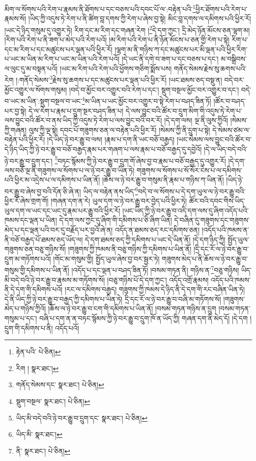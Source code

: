 མིག་ལ་སོགས་པའི་རེག་པ་རྣམས་ནི་ཐོགས་པ་དང་བཅས་པའི་དབང་པོ་ལ་:བརྟེན་པའི་\footnote{རྟེན་པའི་  པེ་ཅིན། }ཕྱིར་ཐོགས་པའི་རེག་པ་རྣམས་སོ། །ཡིད་ཀྱི་འདུས་ཏེ་རེག་པ་ནི་ཚིག་བླ་དགས་ཀྱི་རེག་པ་ཞེས་བྱ་སྟེ། མིང་བླ་དགས་ལ་དམིགས་པའི་ཕྱིར་རོ། །ཡང་དེ་ཉིད་གསུམ་དུ་འགྱུར་ཏེ། རིག་དང་མ་རིག་དང་གཞན་རེག །\footnote{རིག །  སྣར་ཐང་། }དེ་དག་ཀྱང་། དྲི་མེད་ཉོན་མོངས་ཅན་ལྷག་མ། །རིག་པའི་རེག་པ་ནི་ཟག་པ་མེད་པའི་རེག་པའོ། །མ་རིག་པའི་རེག་པ་ནི་ཉོན་མོངས་པ་ཅན་གྱི་རེག་པ་སྟེ། རིག་པ་དང་མ་རིག་པ་དང་མཚུངས་པར་ལྡན་པའི་ཕྱིར་རོ། །ལྷག་མ་ནི་གཉིས་ཀ་དང་མཚུངས་པར་མི་ལྡན་པའི་ཕྱིར་རིག་པ་ཡང་མ་ཡིན་མ་རིག་པ་ཡང་མ་ཡིན་པའི་རེག་པའོ། །དེ་ཡང་ནི་དགེ་བ་ཟག་པ་དང་བཅས་པ་དང་། མ་བསྒྲིབས་ལ་ལུང་དུ་མ་བསྟན་པའོ། །ཡང་མ་རིག་པའི་རེག་པའི་ཕྱོགས་གཅིག་སྨོས་པས། གནོད་སེམས་རྗེས་སུ་ཆགས་པའི་རེག །:གནོད་སེམས་\footnote{གནོད་སེམས་དང་  སྣར་ཐང་།  པེ་ཅིན། }རྗེས་སུ་ཆགས་པ་དང་མཚུངས་པར་ལྡན་པའི་ཕྱིར་རོ། །ཡང་ཐམས་ཅད་བསྡུ་ན། བདེ་བར་མྱོང་འགྱུར་ལ་སོགས་གསུམ། །བདེ་བ་མྱོང་བར་འགྱུར་བའི་རེག་པ་དང་། སྡུག་བསྔལ་མྱོང་བར་འགྱུར་བ་དང་། བདེ་བ་ཡང་མ་ཡིན་:སྡུག་བསྔལ་བ་ཡང་\footnote{སྡུག་བསྔལ་  སྣར་ཐང་།  པེ་ཅིན། }མ་ཡིན་པ་ཡང་མྱོང་བར་འགྱུར་བ་སྟེ་རེག་པ་བཤད་ཟིན་ཏོ། །ཚོར་བ་བཤད་པར་བྱ་སྟེ། དེ་ལ་རེག་པ་རྣམ་པ་དྲུག་སྔར་བཤད་ཟིན་པ། དེ་ལས་བྱུང་བའི་ཚོར་བ་དྲུག་མིག་གི་འདུས་ཏེ་རེག་པ་ལས་བྱུང་བའི་ཚོར་བ་ནས་ཡིད་ཀྱི་འདུས་ཏེ་རེག་པ་ལས་བྱུང་བའི་བར་རོ། །དེ་དག་ལས། ལྔ་ནི་ལུས་ཀྱིའོ། །སེམས་ཀྱི་གཞན། ལུས་ཀྱི་ལྔ་སྟེ། དབང་པོ་གཟུགས་ཅན་ལ་བརྟེན་པའི་ཕྱིར་རོ། །སེམས་ཀྱི་ནི་དྲུག་པ་སྟེ། དེ་སེམས་ཙམ་ལ་བརྟེན་པའི་ཕྱིར་རོ། །དེ་ཡིད་ཉེ་བར་རྒྱུ་བ་ལས། །རྣམ་པ་དག་ནི་ཡང་བཅོ་བརྒྱད། །ཡང་སེམས་ལས་བྱུང་བའི་ཚོར་བ་དེ་ཉིད་ཡིད་ཀྱི་ཉེ་བར་རྒྱུ་བ་བཅོ་བརྒྱད་རྣམ་པར་གཞག་པ་ལས་རྣམ་པ་བཅོ་བརྒྱད་དུ་དབྱེའོ། །དེ་ལ་ཡིད་བདེ་བའི་ཉེ་བར་རྒྱུ་བ་དྲུག་དང་། \footnote{ཡིད་མི་བདེ་བའི་ཉེ་བར་རྒྱུ་བ་དྲུག་དང་  སྣར་ཐང་།  པེ་ཅིན། }བཏང་སྙོམས་ཀྱི་ཉེ་བར་རྒྱུ་བ་དྲུག་གོ་ཞེས་བྱ་བ་རྣམ་པ་བཅོ་བརྒྱད་དུ་འགྱུར་རོ། །དེ་དག་ལས་བཅོ་ལྔ་ནི་གཟུགས་ལ་སོགས་པ་ལ་ཉེ་བར་རྒྱུ་བ་ཡིན་ཏེ། གཟུགས་ལ་སོགས་པ་སོ་སོར་ངེས་པ་ལ་དམིགས་པའི་ཕྱིར་མ་འདྲེས་པ་ལ་དམིགས་པ་ཡིན་ནོ། །ཆོས་ལ་ཉེ་བར་རྒྱུ་བ་གསུམ་ནི་རྣམ་པ་གཉིས་ཀ་ཡིན་ནོ། །ཡིད་ཉེ་བར་རྒྱུ་བ་ཞེས་བྱ་བའི་དོན་ཅི་ཞེ་ན། ཡིད་ལ་བརྟེན་ནས་ཡིད་\footnote{ཡིད་མི་  སྣར་ཐང་། }བདེ་བ་ལ་སོགས་པ་དེ་དག་ཡུལ་ལ་ཉེ་བར་རྒྱུ་བའི་ཕྱིར་རོ་ཞེས་གྲག་གོ། །གཞན་དག་ན་རེ། ཡུལ་དག་ལ་ཉེ་བར་རྒྱུ་བར་བྱེད་པའི་ཕྱིར་ཏེ། ཚོར་བའི་དབང་གིས་ཡིད་ཡུལ་དག་ལ་ཡང་དང་ཡང་དུ་རྣམ་པར་རྒྱུ་བའི་ཕྱིར་རོ། །ཡང་ཡིད་ཀྱི་ཉེ་བར་རྒྱུ་བ་འདི་དག་ལས་དུ་ཞིག་འདོད་པའི་ཁམས་དང་ལྡན་པ་ཡིན། དེ་དག་ལས་ཀྱང་དུ་ཞིག་གི་དམིགས་པ་ཅི་ཞིག་ཡིན། དེ་བཞིན་དུ་གཟུགས་དང་གཟུགས་མེད་པ་དང་ལྡན་པའི་བར་དུ་བརྗོད་པར་བྱའོ་ཞེ་ན། འདོད་ན་ཐམས་ཅད་རང་དམིགས་ཅན། །འདོད་པའི་ཁམས་ན་ནི་བཅོ་བརྒྱད་པོ་ཐམས་ཅད་ཡོད་ལ། དེ་དག་ཐམས་ཅད་ཀྱི་དམིགས་པ་ཡང་དེ་ཡིན་ནོ། །དེ་དག་ཉིད་ཀྱི། སྤྱོད་ཡུལ་གཟུགས་ཅན་བཅུ་གཉིས་སོ། །གཟུགས་ཀྱི་ཁམས་ནི་བཅུ་གཉིས་ཀྱི་དམིགས་པ་ཡིན་ནོ། །དྲི་དང་རོ་ལ་ཉེ་བར་རྒྱུ་བ་དྲུག་མ་གཏོགས་པའོ། །གོང་མ་གསུམ་གྱི། སྤྱོད་ཡུལ་ཞེས་བྱ་བར་སྦྱར་ཏེ། གཟུགས་མེད་པ་ནི་ཆོས་ལ་ཉེ་བར་རྒྱུ་བ་གསུམ་གྱི་དམིགས་པ་ཡིན་ནོ། །འདོད་པ་དང་ལྡན་པ་བཤད་ཟིན་ཏོ། །བསམ་གཏན་ནི། གཉིས་ན་\footnote{ནི་  སྣར་ཐང་།  པེ་ཅིན། }བཅུ་གཉིས། ཡིད་མི་བདེ་བའི་ཉེ་བར་རྒྱུ་བ་རྣམས་མ་གཏོགས་སོ། །བཅུ་གཉིས་པོ་དེ་དག་ཀྱང་། འདོད་འགྲོ་རྣམས། འདོད་པའི་ཁམས་ནི་དེ་དག་གི་དམིགས་པའོ། །རང་ལ་དམིགས་བརྒྱད། གཟུགས་ཀྱི་ཁམས་དེ་ཉིད་ནི་དེ་དག་གི་རང་བཞིན་ཡིན་ཏེ། དེ་ནི་ཡིད་ཀྱི་ཉེ་བར་རྒྱུ་བ་བརྒྱད་ཀྱི་དམིགས་པ་ཡིན་ཏེ། དྲི་དང་རོ་ལ་ཉེ་བར་རྒྱུ་བ་བཞི་མ་གཏོགས་སོ། །གཟུགས་མེད་པ་གཉིས་ཀྱིའོ། །ཆོས་ལ་ཉེ་བར་རྒྱུ་བ་ངག་གི་དམིགས་པ་ཡིན་ནོ། །བསམ་གཏན་གཉིས་ན་དྲུག །བསམ་གཏན་གསུམ་པ་དང་། བཞི་པ་དག་ན་ན་བཏང་སྙོམས་ཀྱི་ཉེ་བར་རྒྱུ་བ་དྲུག་ཁོ་ན་ཡོད་ཀྱི། གཞན་དག་ནི་མེད་དོ། །དེ་དག །དྲུག་གི་དམིགས་པ་ནི། འདོད་པའོ། 